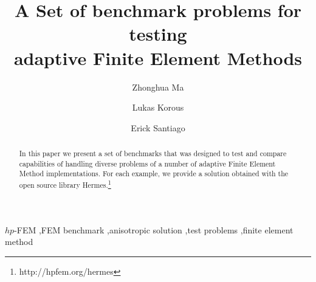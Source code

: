 \begin{frontmatter}

\title{A Set of benchmark problems for testing\\ adaptive Finite Element Methods}

\author[label1]{Zhonghua Ma}
\author[label2]{Lukas Korous}
\author[label3]{Erick Santiago}
\address[label1]{China University of Petroleum, Beijing, China}
\address[label2]{Charles University, Prague, Czech Republic}
\address[label3]{University of Nevada, Reno, USA}

\begin{abstract}
In this paper we present a set of benchmarks that was designed to test and compare capabilities of handling diverse problems of a number of adaptive Finite Element Method implementations.
For each example, we provide a solution obtained with the open source library {\sc Hermes}.\footnote{http://hpfem.org/hermes}
\end{abstract}

\begin{keyword}
$hp$-FEM \sep FEM benchmark \sep anisotropic solution \sep test problems \sep finite element method
\end{keyword}

\end{frontmatter}
